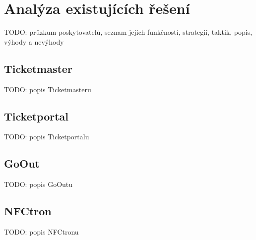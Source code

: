 \chapter{Analýza existujících řešení}
\label{chap:analyza-trhu}
TODO: průzkum poskytovatelů, seznam jejich funkčností, strategií, taktik, popis, výhody a nevýhody

\section{Ticketmaster}
\label{sec:analyza-trhu-ticketmaster}
TODO: popis Ticketmasteru

\section{Ticketportal}
\label{sec:analyza-trhu-ticketportal}
TODO: popis Ticketportalu

\section{GoOut}
\label{sec:analyza-trhu-goout}
TODO: popis GoOutu

\section{NFCtron}
\label{sec:analyza-trhu-nfctron}
TODO: popis NFCtronu
